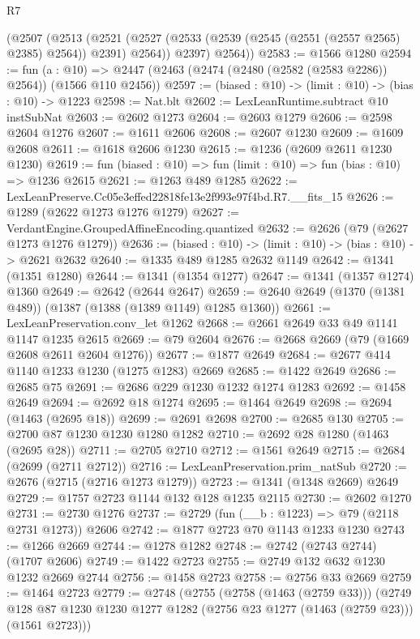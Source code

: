 \begin{lexlean}{R7}
\begin{coremodule}
      (@2507
        (@2513
          (@2521 (@2527 (@2533 (@2539 (@2545 (@2551 (@2557 @2565) @2385) @2564)) @2391) @2564))
          @2397)
        @2564))
@2583 := @1566 @1280
@2594 := fun (a : @10) =>
  @2447 (@2463 (@2474 (@2480 (@2582 (@2583 @2286)) @2564)) (@1566 @110 @2456))
@2597 := (biased : @10) -> (limit : @10) -> (bias : @10) -> @1223
@2598 := Nat.blt
@2602 := LexLeanRuntime.subtract @10 instSubNat
@2603 := @2602 @1273
@2604 := @2603 @1279
@2606 := @2598 @2604 @1276
@2607 := @1611 @2606
@2608 := @2607 @1230
@2609 := @1609 @2608
@2611 := @1618 @2606 @1230
@2615 := @1236 (@2609 @2611 @1230 @1230)
@2619 := fun (biased : @10) => fun (limit : @10) => fun (bias : @10) => @1236 @2615
@2621 := @1263 @489 @1285
@2622 := LexLeanPreserve.Cc05e3effed22818fe13e2f993e97f4bd.R7.__fits_15
@2626 := @1289 (@2622 @1273 @1276 @1279)
@2627 := VerdantEngine.GroupedAffineEncoding.quantized
@2632 := @2626 (@79 (@2627 @1273 @1276 @1279))
@2636 := (biased : @10) -> (limit : @10) -> (bias : @10) -> @2621 @2632
@2640 := @1335 @489 @1285 @2632 @1149
@2642 := @1341 (@1351 @1280)
@2644 := @1341 (@1354 @1277)
@2647 := @1341 (@1357 @1274) @1360
@2649 := @2642 (@2644 @2647)
@2659 := @2640 @2649 (@1370 (@1381 @489)) (@1387 (@1388 (@1389 @1149) @1285 @1360))
@2661 := LexLeanPreservation.conv_let @1262
@2668 := @2661 @2649 @33 @49 @1141 @1147 @1235 @2615
@2669 := @79 @2604
@2676 := @2668 @2669 (@79 (@1669 @2608 @2611 @2604 @1276))
@2677 := @1877 @2649
@2684 := @2677 @414 @1140 @1233 @1230 (@1275 @1283) @2669
@2685 := @1422 @2649
@2686 := @2685 @75
@2691 := @2686 @229 @1230 @1232 @1274 @1283
@2692 := @1458 @2649
@2694 := @2692 @18 @1274
@2695 := @1464 @2649
@2698 := @2694 (@1463 (@2695 @18))
@2699 := @2691 @2698
@2700 := @2685 @130
@2705 := @2700 @87 @1230 @1230 @1280 @1282
@2710 := @2692 @28 @1280 (@1463 (@2695 @28))
@2711 := @2705 @2710
@2712 := @1561 @2649
@2715 := @2684 (@2699 (@2711 @2712))
@2716 := LexLeanPreservation.prim_natSub
@2720 := @2676 (@2715 (@2716 @1273 @1279))
@2723 := @1341 (@1348 @2669) @2649
@2729 := @1757 @2723 @1144 @132 @128 @1235 @2115
@2730 := @2602 @1270
@2731 := @2730 @1276
@2737 := @2729 (fun (__b : @1223) => @79 (@2118 @2731 @1273)) @2606
@2742 := @1877 @2723 @70 @1143 @1233 @1230
@2743 := @1266 @2669
@2744 := @1278 @1282
@2748 := @2742 (@2743 @2744) (@1707 @2606)
@2749 := @1422 @2723
@2755 := @2749 @132 @632 @1230 @1232 @2669 @2744
@2756 := @1458 @2723
@2758 := @2756 @33 @2669
@2759 := @1464 @2723
@2779 := @2748
    (@2755
      (@2758 (@1463 (@2759 @33)))
      (@2749 @128 @87 @1230 @1230 @1277 @1282 (@2756 @23 @1277 (@1463 (@2759 @23))) (@1561 @2723)))

\end{coremodule}
\end{lexlean}
